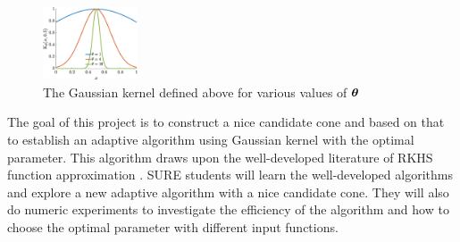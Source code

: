 \begin{figure}
  \begin{center}
    \includegraphics[width=0.25\textwidth]{KthetaPlot.eps} 
  \end{center}
  \caption{The Gaussian kernel defined above for various values of ${\boldsymbol{\theta}}$  \label{fig:GaussThPlot}}
\end{figure}
The goal of this project is to construct a nice candidate cone and based on that to establish an adaptive algorithm using Gaussian kernel with the optimal parameter.
This algorithm draws upon the well-developed literature of RKHS function approximation \cite{Buh03a,Fas07a,FasMcC15a,ForFly15a,ForEtal09,RasWil06a,SchWen06a,Wah85a,Wen05a}. 
SURE students will learn the well-developed algorithms and explore a new adaptive algorithm with a nice candidate cone. 
They will also do numeric experiments to investigate the efficiency of the algorithm and how to choose the optimal parameter with different input functions.
